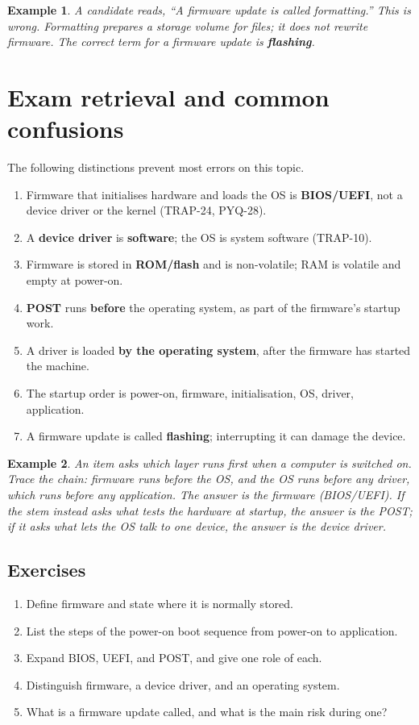 \documentclass[11pt]{article}
\newtheorem{example}{Example}[section]
\begin{document}
\begin{example}
A candidate reads, ``A firmware update is called formatting.'' This is wrong.
Formatting prepares a storage volume for files; it does not rewrite firmware.
The correct term for a firmware update is \textbf{flashing}.
\end{example}

\section{Exam retrieval and common confusions}
The following distinctions prevent most errors on this topic.

\begin{enumerate}
  \item Firmware that initialises hardware and loads the OS is
    \textbf{BIOS/UEFI}, not a device driver or the kernel (TRAP-24, PYQ-28).
  \item A \textbf{device driver} is \textbf{software}; the OS is system
    software (TRAP-10).
  \item Firmware is stored in \textbf{ROM/flash} and is non-volatile; RAM is
    volatile and empty at power-on.
  \item \textbf{POST} runs \textbf{before} the operating system, as part of
    the firmware's startup work.
  \item A driver is loaded \textbf{by the operating system}, after the
    firmware has started the machine.
  \item The startup order is power-on, firmware, initialisation, OS, driver,
    application.
  \item A firmware update is called \textbf{flashing}; interrupting it can
    damage the device.
\end{enumerate}

\begin{example}
An item asks which layer runs first when a computer is switched on. Trace the
chain: firmware runs before the OS, and the OS runs before any driver, which
runs before any application. The answer is the firmware (BIOS/UEFI). If the
stem instead asks what tests the hardware at startup, the answer is the POST;
if it asks what lets the OS talk to one device, the answer is the device
driver.
\end{example}

\subsection*{Exercises}
\begin{enumerate}[label=\arabic*.]
  \item Define firmware and state where it is normally stored.
  \item List the steps of the power-on boot sequence from power-on to
    application.
  \item Expand BIOS, UEFI, and POST, and give one role of each.
  \item Distinguish firmware, a device driver, and an operating system.
  \item What is a firmware update called, and what is the main risk during
    one?
\end{enumerate}
\end{document}

